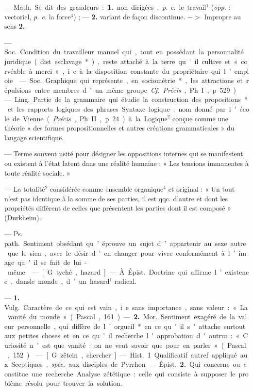 \begin{itemize}[leftmargin=1cm, label=, itemsep=1pt]
 — \si{Math.} Se dit des grandeurs : {\bf 1.} non dirigées, {\it p. e.} le travail$^1$ ({\it opp.} : vectoriel, {\it p. e.} la force$^4$) ;
— {\bf 2.} variant de façon discontinue.
$->$ Impropre au sens {\bf 2.}

 — \si{Soc.} Condition du travailleur manuel qui, tout en possédant la personnalité juridique
(dist. esclavage*), reste attaché à
la terre qu'il cultive et « corvéable
à merci », i.e. à la disposition
constante du propriétaire qui l’emploie.

 — \si{Soc.} Graphique qui
représente, en sociométrie*, les
attractions et répulsions entre
membres d’un même groupe. {\it Cf.}
{\it Précis}, Ph. I, p. 529).

 — \si{Ling.} Partie de la grammaire qui étudie la construction
des propositions* et les rapports
logiques des phrases. Syntaxe logique : nom donné par l’école de
Vienne ({\it Précis}, Ph. II, p. 24) à la
Logique$^2$ conçue comme une théorie « des formes propositionnelles
et autres créations grammaticales »
du langage scientifique.

 — Terme souvent usité
pour désigner les oppositions internes qui se manifestent ou existent à l’état latent dans une réalité
humaine : « Les tensions immanentes à toute réalité sociale. »

 — La totalité$^2$ considérée
comme ensemble organique$^4$ et
original : « Un tout n’est pas identique à la somme de ses parties,
il est qqc. d’autre et dont les propriétés diffèrent de celles que présentent les parties dont il est composé » (Durkheim).

 — \si{Ps. path.} Sentiment obsédant qu’éprouve un sujet
d’appartenir au sexe autre que le
sien, avec le désir d'en changer
pour vivre conformément à l’image
qu'il se fait de lui-même.

 — [G. tyché, hazard] —
À \si{Épist.} Doctrine qui affirme l’existence, dansle monde, d’un hasard$^1$
radical.

 — {\bf 1.} \si{Vulg.} Caractère de ce
qui est vain, i.e. sans importance,
sans valeur : « La vanité du
monde » (Pascal, 161). — {\bf 2.} \si{Mor.}
Sentiment exagéré de la valeur
personnelle, qui diffère de l’orgueil*
en ce qu'il s'attache surtout aux
petites choses et en ce qu'il recherche l'approbation d'autrui : « Curiosité n’est que vanité : on ne veut
savoir que pour en parler » (Pascal,
152).

 — [G. zêtein, chercher] — \si{Hist.}
1. Qualificatif autref. appliqué aux
Sceptiques, {\it spéc.} aux disciples de
Pyrrhon. — \si{Épist.} {\bf 2.} Qui concerne
ou constitue une recherche. Analyse zététique : celle qui consiste à
supposer le problème résolu pour
trouver la solution.

	\end{itemize}
